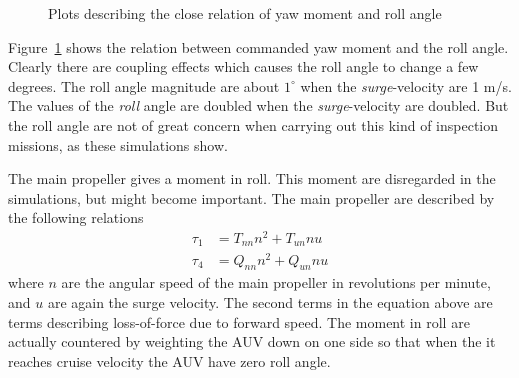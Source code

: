 	\begin{figure}[htbp]
		\centering
		\caption{Plots describing the close relation of yaw moment and roll angle}
		\label{fig:ch4_rollyawmoment}
	\end{figure}
	Figure~\ref{fig:ch4_rollyawmoment} shows the relation between commanded yaw moment and the roll angle.
	Clearly there are coupling effects which causes the roll angle to change a few degrees. The roll angle
	magnitude are about $1^\circ$ when the \textit{surge}-velocity are 1 m/s. The values of the
	\textit{roll} angle are doubled when the \textit{surge}-velocity are doubled. But the roll angle are not
	of great concern when carrying out this kind of inspection missions, as these simulations show.

	
	The main propeller gives a moment in roll. This moment are disregarded in the simulations, but might
	become important. The main propeller are described by the following relations
	\begin{equation}
		\begin{aligned}
			\tau_1 &= T_{nn} n^2 + T_{un} n u \\
			\tau_4 &= Q_{nn} n^2 + Q_{un} n u
		\end{aligned}
	\end{equation}
	where $n$ are the angular speed of the main propeller in revolutions per minute, and $u$ are again the
	surge velocity. The second terms in the equation above are terms describing loss-of-force due to
	forward speed. The moment in roll are actually countered by weighting the AUV down on one side so that when
	the it reaches cruise velocity the AUV have zero roll angle. \cite{Bjorn_gjelstad_talk}

